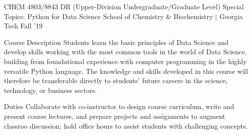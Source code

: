 \begin{cventries}


  \cvteachingentry
    {CHEM 4803/8843 DR (Upper-Division Undergraduate/Graduate Level)} %
    {Special Topics: Python for Data Science} %
    {School of Chemistry \& Biochemistry $\vert$ Georgia Tech} %
    {Fall '19} %
    {%
    \begin{cvdescription}
    \item[Course Description] Students learn the basic principles of Data Science
        and develop skills working with the most common tools in the world of Data
        Science, building from foundational experience with computer programming in the
        highly versatile Python language. The knowledge and skills developed in this
        course will therefore be transferable directly to students’ future careers in
        the science, technology, or business sectors.
    \item[Duties] Collaborate with co-instructor to design course curriculum, write and 
        present course lectures, and prepare projects and assignments to augment classroo
        discussion; hold office hours to assist students with challenging concepts.
    \end{cvdescription}
    }

\end{cventries}


